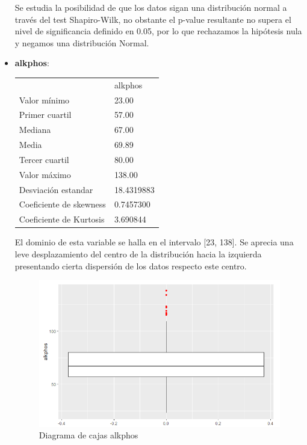 \begin{itemize}
Se estudia la posibilidad de que los datos sigan una distribución normal a través del test Shapiro-Wilk, no obstante el p-value resultante no supera el nivel de significancia definido en 0.05, por lo que rechazamos la hipótesis nula y negamos una distribución Normal.\\



	
	\item \textbf{alkphos}: 
	\begin{table}[h!]
		\centering
		\begin{tabular}{ll}
			& alkphos    \\
			Valor mínimo            & 23.00      \\
			Primer cuartil          & 57.00      \\
			Mediana                 & 67.00      \\
			Media                   & 69.89      \\
			Tercer cuartil          & 80.00      \\
			Valor máximo            & 138.00     \\ \hline
			Desviación estandar     & 18.4319883 \\ \hline
			Coeficiente de skewness & 0.7457300  \\
			Coeficiente de Kurtosis & 3.690844  
		\end{tabular}
	\end{table}

El dominio de esta variable se halla en el intervalo [23, 138]. Se aprecia una leve desplazamiento del centro de la distribución hacia la izquierda presentando cierta dispersión de los datos respecto este centro. 
\newpage
\begin{figure}[h!]
	\centering
	\includegraphics[width=0.7\linewidth]{figures/box_2}
	\caption{Diagrama de cajas alkphos}
	\label{fig:box2}
\end{figure}


\end{itemize}

